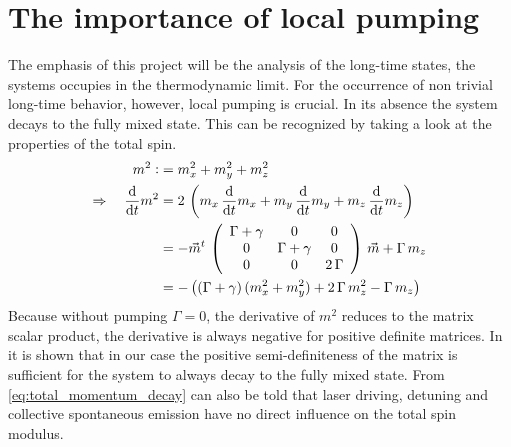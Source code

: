 \section{The importance of local pumping}
The emphasis of this project will be the analysis of the long-time states, the systems occupies in the thermodynamic limit. For the occurrence of non trivial long-time behavior, however, local pumping  is crucial. In its absence the system decays to the fully mixed state. This can be recognized by taking a look at the properties of the total spin.
\begin{align}\label{eq:total_momentum_decay}
    m^2\vcentcolon&=m_x^2+m_y^2+m_z^2\notag\\
    \Rightarrow\quad\frac{\text{d}}{\text{d}t} m^2&=2\,\left( m_x\,\frac{\text{d}}{\text{d}t} m_x +m_y\,\frac{\text{d}}{\text{d}t} m_y +m_z\,\frac{\text{d}}{\text{d}t} m_z \right)\notag\\
    &=-\vec{m}^t\,\left( \begin{array}{ccc}
        \Gamma+\gamma & 0&0  \\
        0& \Gamma+\gamma & 0\\
        0&0&2\,\Gamma
   \end{array}\right)\,\vec{m}+\Gamma\,m_z\notag\\
   &=-\left(  (\Gamma+\gamma)\,(m_x^2+m_y^2)+2\,\Gamma\,m_z^2-\Gamma\,m_z \right)
\end{align}
Because without pumping $\Gamma=0$, the derivative of $m^2$ reduces to the matrix scalar product, the derivative is always negative for positive definite matrices.  In  it is shown that in our case the positive semi-definiteness of the matrix is sufficient for the system to always decay to the fully mixed state. From \eqref{eq:total_momentum_decay} can also be told that laser driving, detuning and collective spontaneous emission have no direct influence on the total spin modulus.
